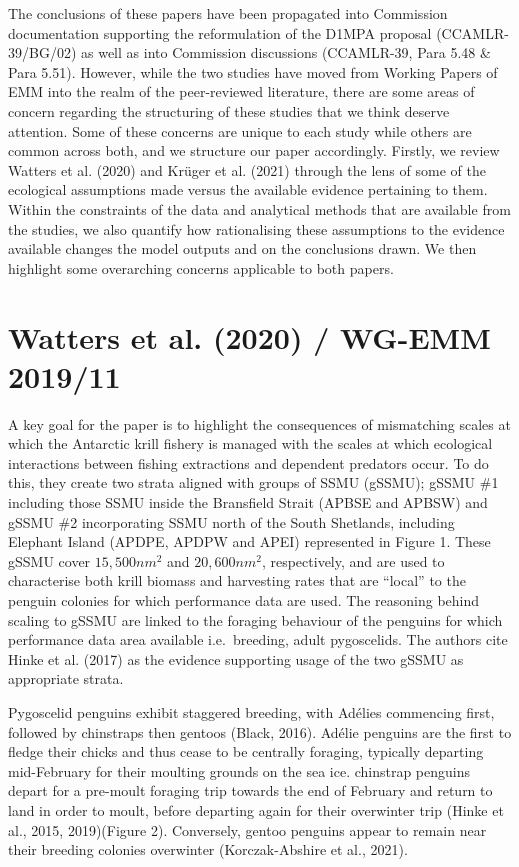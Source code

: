 \documentclass[]{elsarticle} %
\begin{document}
The conclusions of these papers have been propagated into Commission
documentation supporting the reformulation of the D1MPA proposal
(CCAMLR-39/BG/02) as well as into Commission discussions (CCAMLR-39,
Para 5.48 \& Para 5.51). However, while the two studies have moved from
Working Papers of EMM into the realm of the peer-reviewed literature,
there are some areas of concern regarding the structuring of these
studies that we think deserve attention. Some of these concerns are
unique to each study while others are common across both, and we
structure our paper accordingly. Firstly, we review Watters et al.
(2020) and Krüger et al. (2021) through the lens of some of the
ecological assumptions made versus the available evidence pertaining to
them. Within the constraints of the data and analytical methods that are
available from the studies, we also quantify how rationalising these
assumptions to the evidence available changes the model outputs and on
the conclusions drawn. We then highlight some overarching concerns
applicable to both papers.

\hypertarget{watters2020-wg-emm-201911}{%
\section{Watters et al. (2020) / WG-EMM
2019/11}\label{watters2020-wg-emm-201911}}

A key goal for the paper is to highlight the consequences of mismatching
scales at which the Antarctic krill fishery is managed with the scales
at which ecological interactions between fishing extractions and
dependent predators occur. To do this, they create two strata aligned
with groups of SSMU (gSSMU); gSSMU \#1 including those SSMU inside the
Bransfield Strait (APBSE and APBSW) and gSSMU \#2 incorporating SSMU
north of the South Shetlands, including Elephant Island (APDPE, APDPW
and APEI) represented in Figure 1. These gSSMU cover \(15,500nm^2\) and
\(20,600nm^2\), respectively, and are used to characterise both krill
biomass and harvesting rates that are ``local'' to the penguin colonies
for which performance data are used. The reasoning behind scaling to
gSSMU are linked to the foraging behaviour of the penguins for which
performance data area available i.e.~breeding, adult pygoscelids. The
authors cite Hinke et al. (2017) as the evidence supporting usage of the
two gSSMU as appropriate strata.

Pygoscelid penguins exhibit staggered breeding, with Adélies commencing
first, followed by chinstraps then gentoos (Black, 2016). Adélie
penguins are the first to fledge their chicks and thus cease to be
centrally foraging, typically departing mid-February for their moulting
grounds on the sea ice. chinstrap penguins depart for a pre-moult
foraging trip towards the end of February and return to land in order to
moult, before departing again for their overwinter trip (Hinke et al.,
2015, 2019)(Figure 2). Conversely, gentoo penguins appear to remain near
their breeding colonies overwinter (Korczak-Abshire et al., 2021).
\end{document}
